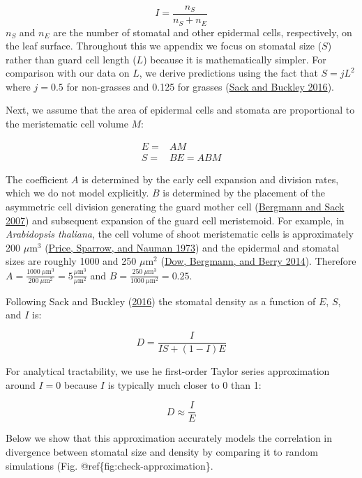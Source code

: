 \documentclass[
  12pt,
]{article}
\begin{document}
\[I = \frac{n_S}{n_S + n_E}\]
\(n_S\) and \(n_E\) are the number of stomatal and other epidermal cells, respectively, on the leaf surface. Throughout this we appendix we focus on stomatal size (\(S\)) rather than guard cell length (\(L\)) because it is mathematically simpler. For comparison with our data on \(L\), we derive predictions using the fact that \(S = j L^2\) where \(j=0.5\) for non-grasses and 0.125 for grasses (\protect\hyperlink{ref-sack_developmental_2016}{Sack and Buckley 2016}).

Next, we assume that the area of epidermal cells and stomata are proportional to the meristematic cell volume \(M\):

\begin{align}
  E = & A M \\
  S = & B E = A B M
  \label{eq:eq1}
\end{align}

The coefficient \(A\) is determined by the early cell expansion and division rates, which we do not model explicitly. \(B\) is determined by the placement of the asymmetric cell division generating the guard mother cell (\protect\hyperlink{ref-bergmann_stomatal_2007}{Bergmann and Sack 2007}) and subsequent expansion of the guard cell meristemoid. For example, in \emph{Arabidopsis thaliana}, the cell volume of shoot meristematic cells is approximately 200 \(\mu\textrm{m}^3\) (\protect\hyperlink{ref-price_correlations_1973}{Price, Sparrow, and Nauman 1973}) and the epidermal and stomatal sizes are roughly 1000 and 250 \(\mu\textrm{m}^2\) (\protect\hyperlink{ref-dow_integrated_2014}{Dow, Bergmann, and Berry 2014}). Therefore \(A = \frac{1000~\mu\textrm{m}^3}{200 ~\mu\textrm{m}^2} = 5 \frac{\mu\textrm{m}^3}{\mu\textrm{m}^2}\) and \(B = \frac{250~\mu\textrm{m}^3}{1000 ~\mu\textrm{m}^2} = 0.25\).

Following Sack and Buckley (\protect\hyperlink{ref-sack_developmental_2016}{2016}) the stomatal density as a function of \(E\), \(S\), and \(I\) is:

\[D = \frac{I}{IS + (1 - I) E}\]

For analytical tractability, we use he first-order Taylor series approximation around \(I = 0\) because \(I\) is typically much closer to 0 than 1:

\[D \approx \frac{I}{E}\]

Below we show that this approximation accurately models the correlation in divergence between stomatal size and density by comparing it to random simulations (Fig. @ref\{fig:check-approximation\}.
\end{document}
